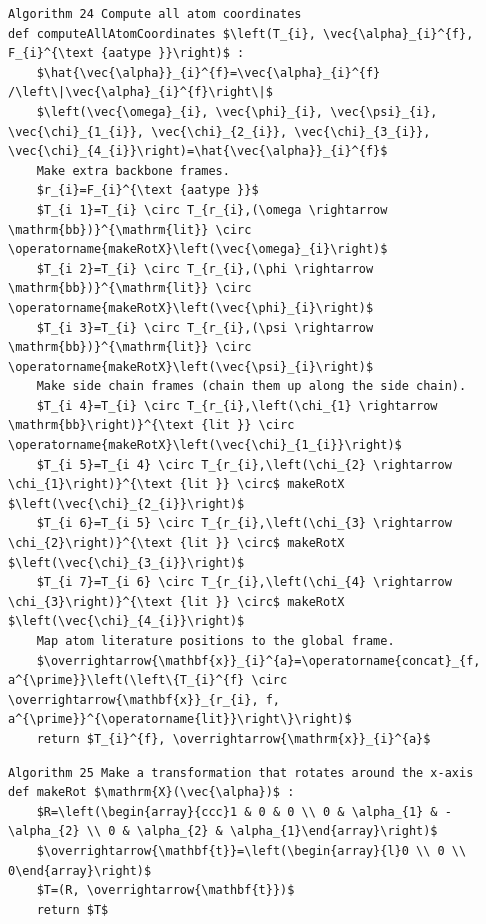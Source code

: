 \documentclass[10pt]{article}
\begin{document}
\begin{verbatim}
Algorithm 24 Compute all atom coordinates
def computeAllAtomCoordinates $\left(T_{i}, \vec{\alpha}_{i}^{f}, F_{i}^{\text {aatype }}\right)$ :
    $\hat{\vec{\alpha}}_{i}^{f}=\vec{\alpha}_{i}^{f} /\left\|\vec{\alpha}_{i}^{f}\right\|$
    $\left(\vec{\omega}_{i}, \vec{\phi}_{i}, \vec{\psi}_{i}, \vec{\chi}_{1_{i}}, \vec{\chi}_{2_{i}}, \vec{\chi}_{3_{i}}, \vec{\chi}_{4_{i}}\right)=\hat{\vec{\alpha}}_{i}^{f}$
    Make extra backbone frames.
    $r_{i}=F_{i}^{\text {aatype }}$
    $T_{i 1}=T_{i} \circ T_{r_{i},(\omega \rightarrow \mathrm{bb})}^{\mathrm{lit}} \circ \operatorname{makeRotX}\left(\vec{\omega}_{i}\right)$
    $T_{i 2}=T_{i} \circ T_{r_{i},(\phi \rightarrow \mathrm{bb})}^{\mathrm{lit}} \circ \operatorname{makeRotX}\left(\vec{\phi}_{i}\right)$
    $T_{i 3}=T_{i} \circ T_{r_{i},(\psi \rightarrow \mathrm{bb})}^{\mathrm{lit}} \circ \operatorname{makeRotX}\left(\vec{\psi}_{i}\right)$
    Make side chain frames (chain them up along the side chain).
    $T_{i 4}=T_{i} \circ T_{r_{i},\left(\chi_{1} \rightarrow \mathrm{bb}\right)}^{\text {lit }} \circ \operatorname{makeRotX}\left(\vec{\chi}_{1_{i}}\right)$
    $T_{i 5}=T_{i 4} \circ T_{r_{i},\left(\chi_{2} \rightarrow \chi_{1}\right)}^{\text {lit }} \circ$ makeRotX $\left(\vec{\chi}_{2_{i}}\right)$
    $T_{i 6}=T_{i 5} \circ T_{r_{i},\left(\chi_{3} \rightarrow \chi_{2}\right)}^{\text {lit }} \circ$ makeRotX $\left(\vec{\chi}_{3_{i}}\right)$
    $T_{i 7}=T_{i 6} \circ T_{r_{i},\left(\chi_{4} \rightarrow \chi_{3}\right)}^{\text {lit }} \circ$ makeRotX $\left(\vec{\chi}_{4_{i}}\right)$
    Map atom literature positions to the global frame.
    $\overrightarrow{\mathbf{x}}_{i}^{a}=\operatorname{concat}_{f, a^{\prime}}\left(\left\{T_{i}^{f} \circ \overrightarrow{\mathbf{x}}_{r_{i}, f, a^{\prime}}^{\operatorname{lit}}\right\}\right)$
    return $T_{i}^{f}, \overrightarrow{\mathrm{x}}_{i}^{a}$
\end{verbatim}

\begin{verbatim}
Algorithm 25 Make a transformation that rotates around the x-axis
def makeRot $\mathrm{X}(\vec{\alpha})$ :
    $R=\left(\begin{array}{ccc}1 & 0 & 0 \\ 0 & \alpha_{1} & -\alpha_{2} \\ 0 & \alpha_{2} & \alpha_{1}\end{array}\right)$
    $\overrightarrow{\mathbf{t}}=\left(\begin{array}{l}0 \\ 0 \\ 0\end{array}\right)$
    $T=(R, \overrightarrow{\mathbf{t}})$
    return $T$
\end{verbatim}
\end{document}
